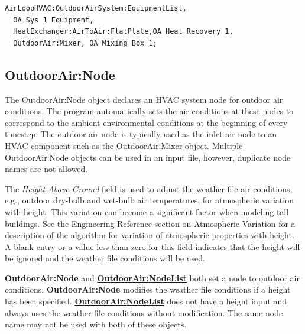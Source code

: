 \begin{lstlisting}
AirLoopHVAC:OutdoorAirSystem:EquipmentList,
  OA Sys 1 Equipment,
  HeatExchanger:AirToAir:FlatPlate,OA Heat Recovery 1,
  OutdoorAir:Mixer, OA Mixing Box 1;
\end{lstlisting}

\subsection{OutdoorAir:Node}\label{outdoorairnode}

The OutdoorAir:Node object declares an HVAC system node for outdoor air conditions. The program automatically sets the air conditions at these nodes to correspond to the ambient environmental conditions at the beginning of every timestep. The outdoor air node is typically used as the inlet air node to an HVAC component such as the \hyperref[outdoorairmixer]{OutdoorAir:Mixer} object. Multiple OutdoorAir:Node objects can be used in an input file, however, duplicate node names are not allowed.

The \emph{Height Above Ground} field is used to adjust the weather file air conditions, e.g., outdoor dry-bulb and wet-bulb air temperatures, for atmospheric variation with height. This variation can become a significant factor when modeling tall buildings. See the Engineering Reference section on Atmospheric Variation for a description of the algorithm for variation of atmospheric properties with height. A blank entry or a value less than zero for this field indicates that the height will be ignored and the weather file conditions will be used.

\textbf{OutdoorAir:Node} and \textbf{\hyperref[outdoorairnodelist]{OutdoorAir:\hyperref[nodelist]{NodeList}}} both set a node to outdoor air conditions. \textbf{OutdoorAir:Node} modifies the weather file conditions if a height has been specified. \textbf{\hyperref[outdoorairnodelist]{OutdoorAir:\hyperref[nodelist]{NodeList}}} does not have a height input and always uses the weather file conditions without modification. The same node name may not be used with both of these objects.

